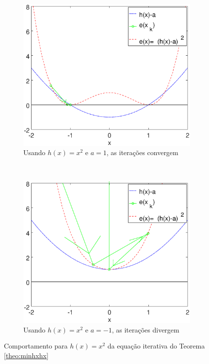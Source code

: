 \begin{figure}[!h]
    \centering
    \begin{subfigure}[b]{0.45\textwidth}
        \includegraphics[width=\textwidth]{chapters/minimization-hx/mfiles/hx_a/minimizando_hx_a_1.eps}
        \caption{Usando $h(x)=x^2$ e $a=1$, as iterações convergem}
        \label{fig:hxacasesa}
    \end{subfigure}
    ~ %
    \begin{subfigure}[b]{0.45\textwidth}
        \includegraphics[width=\textwidth]{chapters/minimization-hx/mfiles/hx_a/minimizando_hx_a_2.eps}
        \caption{Usando $h(x)=x^2$ e $a=-1$, as iterações divergem}
        \label{fig:hxacasesb}
    \end{subfigure}
    \caption{Comportamento para $h(x)=x^2$ da equação iterativa do Teorema \ref{theo:minhxhx}}
    \label{fig:hxacases}
\end{figure}

